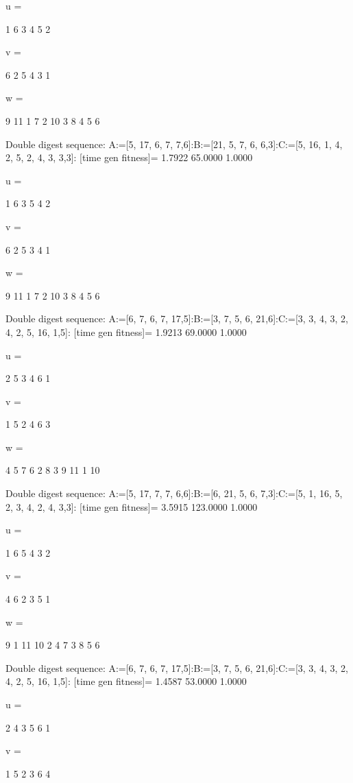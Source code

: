 u =

     1     6     3     4     5     2


v =

     6     2     5     4     3     1


w =

     9    11     1     7     2    10     3     8     4     5     6

Double digest sequence:
A:=[5, 17, 6, 7, 7,6]:B:=[21, 5, 7, 6, 6,3]:C:=[5, 16, 1, 4, 2, 5, 2, 4, 3, 3,3]:
[time gen fitness]=
    1.7922   65.0000    1.0000


u =

     1     6     3     5     4     2


v =

     6     2     5     3     4     1


w =

     9    11     1     7     2    10     3     8     4     5     6

Double digest sequence:
A:=[6, 7, 6, 7, 17,5]:B:=[3, 7, 5, 6, 21,6]:C:=[3, 3, 4, 3, 2, 4, 2, 5, 16, 1,5]:
[time gen fitness]=
    1.9213   69.0000    1.0000


u =

     2     5     3     4     6     1


v =

     1     5     2     4     6     3


w =

     4     5     7     6     2     8     3     9    11     1    10

Double digest sequence:
A:=[5, 17, 7, 7, 6,6]:B:=[6, 21, 5, 6, 7,3]:C:=[5, 1, 16, 5, 2, 3, 4, 2, 4, 3,3]:
[time gen fitness]=
    3.5915  123.0000    1.0000


u =

     1     6     5     4     3     2


v =

     4     6     2     3     5     1


w =

     9     1    11    10     2     4     7     3     8     5     6

Double digest sequence:
A:=[6, 7, 6, 7, 17,5]:B:=[3, 7, 5, 6, 21,6]:C:=[3, 3, 4, 3, 2, 4, 2, 5, 16, 1,5]:
[time gen fitness]=
    1.4587   53.0000    1.0000


u =

     2     4     3     5     6     1


v =

     1     5     2     3     6     4


